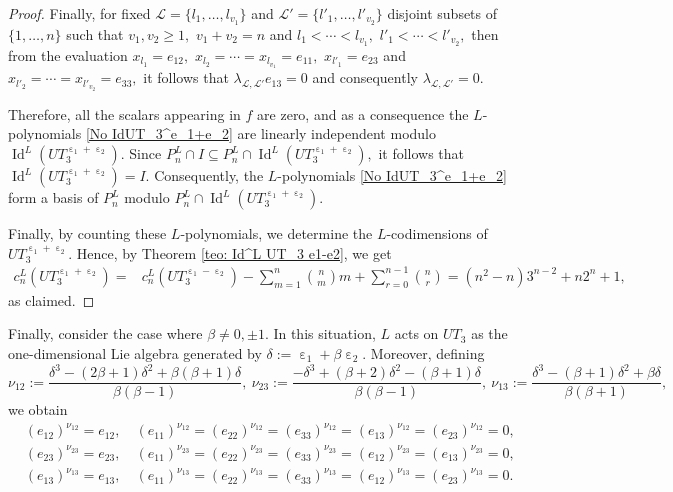 \documentclass[a4paper,reqno]{amsart}
\theoremstyle{definition}
\numberwithin{equation}{section}
\numberwithin{theorem}{section}
\DeclareMathOperator{\I}{Id}
\DeclareMathOperator{\e}{\varepsilon}
\begin{document}
\begin{proof}
Finally, for fixed $\mathcal{L}=\{l_1,\ldots,l_{v_1}\}$ and $\mathcal{L}'=\{l'_1,\ldots,l'_{v_2}\}$ disjoint subsets of $\{1,\ldots,n\}$ such that $v_1,v_2\geq 1,$ $v_1+v_2=n$ and $l_1< \cdots < l_{v_1},$ $l'_1<  \cdots < l'_{v_2},$ then from the evaluation  $x_{l_1}=e_{12},$ $x_{l_2}=\cdots = x_{l_{v_1}}= e_{11},$ $x_{l'_1}=e_{23}$ and $x_{l'_2}= \cdots = x_{l'_{v_2}}= e_{33},$ it follows that $\lambda_{\mathcal{L}, \mathcal{L}'}e_{13}=0$ and consequently $\lambda_{\mathcal{L}, \mathcal{L}'}=0.$ 

Therefore, all the scalars appearing in $f$ are zero, and as a consequence the $L$-polynomials \eqref{No IdUT_3^e_1+e_2} are linearly independent modulo $\I^L(UT_3^{\e_1+\e_2})$. Since $P_n^L\cap I\subseteq P_n^L\cap \I^L(UT_3^{\e_1+\e_2}),$ it follows that $\I^L(UT_3^{\e_1+\e_2})= I$. Consequently, the $L$-polynomials \eqref{No IdUT_3^e_1+e_2} form a basis of $P_n^L$ modulo $P_n^L\cap \I^L(UT_3^{\e_1+\e_2}).$ 

Finally, by counting these $L$-polynomials, we determine the $L$-codimensions of $UT_3^{\e_1+\e_2}$.  Hence, by Theorem \ref{teo: Id^L UT_3 e1-e2}, we get
\begin{align*}
     c_n^L(UT_3^{\e_1+\e_2})=&c_n^L(UT_3^{\e_1 - \e_2})-\sum_{m=1}^n \binom{n}{m} m + \sum_{r=0}^{n-1} \binom{n}{r}
=(n^2-n)3^{n-2}+n2^n+1,
\end{align*}
as claimed.
\end{proof}


Finally, consider the case where $\beta \neq 0, \pm 1$. In this situation, $L$ acts on $UT_3$ as the one-dimensional Lie algebra generated by $\delta:=\e_1+\beta\e_2.$ Moreover, defining $$\nu_{12}:=\frac{\delta^3- (2\beta+1)\delta^2+\beta(\beta+1)\delta}{\beta(\beta-1)}, \ \nu_{23}:= \frac{-\delta^3+(\beta+2)\delta^2-(\beta+1)\delta}{\beta(\beta-1)}, \ \nu_{13}:=\frac{\delta^3-(\beta+1)\delta^2+\beta \delta}{\beta(\beta+1)},$$
we obtain
\begin{align}
    \label{eq: nu_12 beta}
    &(e_{12})^{\nu_{12}}=e_{12},  \quad (e_{11})^{\nu_{12}} = (e_{22})^{\nu_{12}} = (e_{33})^{\nu_{12}}= (e_{13})^{\nu_{12}} =(e_{23})^{\nu_{12}}=0,\\
    \label{eq: nu_23 beta}
    &(e_{23})^{\nu_{23}}=e_{23},  \quad (e_{11})^{\nu_{23}} = (e_{22})^{\nu_{23}} = (e_{33})^{\nu_{23}}= (e_{12})^{\nu_{23}} =(e_{13})^{\nu_{23}}=0,\\
    \label{eq: nu_13 beta}
   &(e_{13})^{\nu_{13}}=e_{13}, \quad  (e_{11})^{\nu_{13}} = (e_{22})^{\nu_{13}} = (e_{33})^{\nu_{13}}= (e_{12})^{\nu_{13}}=(e_{23})^{\nu_{13}} =0.
\end{align}
\end{document}
